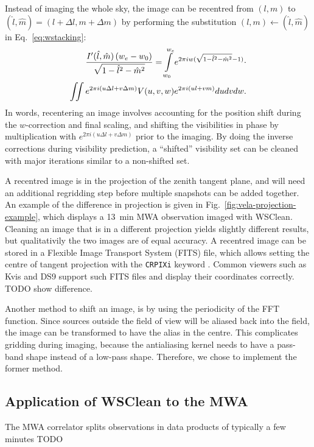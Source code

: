 \documentclass[useAMS,usenatbib]{mn2e}
\begin{document}
Instead of imaging the whole sky, the image can be recentred from $(l,m)$ to $(\hat{l},\hat{m})=(l+\Delta l,m+\Delta m)$ by performing the substitution $(l,m)\leftarrow(\hat{l},\hat{m})$ in Eq.~\eqref{eq:wstacking}:
\begin{align}\notag
\frac{I'(\hat{l}, \hat{m})\left(w_e - w_0\right)}{\sqrt{1-\hat{l}^2-\hat{m}^2}} = \int\limits_{w_0}^{w_e} e^{2\pi i w(\sqrt{1-\hat{l}^2-\hat{m}^2}-1)} \cdot \\
\iint e^{2 \pi i \left(u\Delta l + v\Delta m\right)} V(u,v,w) e^{2\pi i \left(ul + vm\right)} du dv dw.
\end{align}
In words, recentering an image involves accounting for the position shift during the $w$-correction and final scaling, and shifting the visibilities in phase by multiplication with $e^{2 \pi i \left(u\Delta l + v\Delta m\right)}$ prior to the imaging. By doing the inverse corrections during visibility prediction, a ``shifted'' visibility set can be cleaned with major iterations similar to a non-shifted set.

A recentred image is in the projection of the zenith tangent plane, and will need an additional regridding step before multiple snapshots can be added together. An example of the difference in projection is given in Fig.~\ref{fig:vela-projection-example}, which displays a 13~min MWA observation imaged with WSClean. Cleaning an image that is in a different projection yields slightly different results, but qualitativily the two images are of equal accuracy. A recentred image can be stored in a Flexible Image Transport System (FITS) file, which allows setting the centre of tangent projection with the \texttt{CRPIXi} keyword \citep{wcs-in-fits}. Common viewers such as Kvis and DS9 support such FITS files and display their coordinates correctly. TODO show difference.

Another method to shift an image, is by using the periodicity of the FFT function. Since sources outside the field of view will be aliased back into the field, the image can be transformed to have the alias in the centre. This complicates gridding during imaging, because the antialiasing kernel needs to have a pass-band shape instead of a low-pass shape. Therefore, we chose to implement the former method.

\subsection{Application of WSClean to the MWA}
The MWA correlator splits observations in data products of typically a few minutes
TODO
\end{document}
